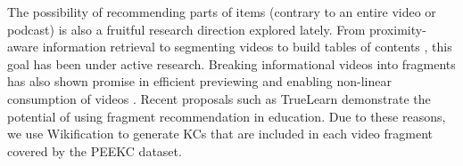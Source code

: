 \documentclass[letterpaper]{article} %
\begin{document}
The possibility of recommending parts of items (contrary to an entire video or podcast) is also a fruitful research direction explored lately. From proximity-aware information retrieval
\cite{schenkel2007efficient} to segmenting videos to build tables of contents \cite{videoken}, this goal has been under active research. Breaking informational videos into fragments has also shown promise in efficient previewing \cite{chen2018temporally} and enabling non-linear consumption of videos \cite{non_lin}. Recent proposals such as TrueLearn \cite{truelearn} demonstrate the potential of using fragment recommendation in education. %
Due to these reasons, we use Wikification \cite{wikifier} to generate KCs that are included in each video fragment covered by the PEEKC dataset.




\end{document}
